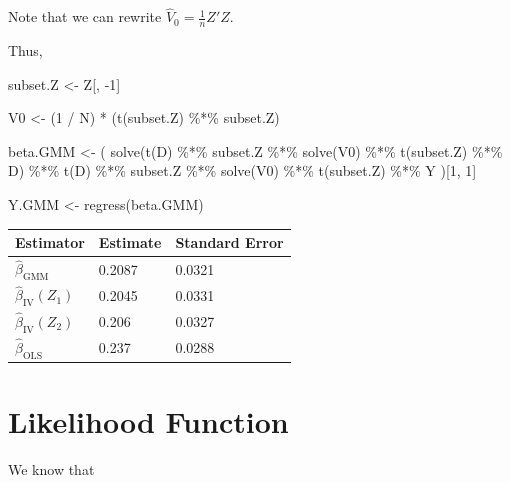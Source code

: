 \documentclass[9pt,twocolumn,twoside,]{pnas-new}
\newenvironment{Shaded}{}{}
\newcommand{\DecValTok}[1]{\textcolor[rgb]{0.25,0.63,0.44}{#1}}
\newcommand{\FunctionTok}[1]{\textcolor[rgb]{0.02,0.16,0.49}{#1}}
\newcommand{\NormalTok}[1]{#1}
\newcommand{\OtherTok}[1]{\textcolor[rgb]{0.00,0.44,0.13}{#1}}
\newcommand{\SpecialCharTok}[1]{\textcolor[rgb]{0.25,0.44,0.63}{#1}}
\begin{document}
Note that we can rewrite \(\displaystyle \hat{V}_0 = \frac{1}{n} Z' Z\).

Thus,

\begin{Shaded}
\begin{Highlighting}[]
\NormalTok{subset.Z }\OtherTok{\textless{}{-}}\NormalTok{ Z[, }\SpecialCharTok{{-}}\DecValTok{1}\NormalTok{]}

\NormalTok{V0 }\OtherTok{\textless{}{-}}\NormalTok{ (}\DecValTok{1} \SpecialCharTok{/}\NormalTok{ N) }\SpecialCharTok{*}\NormalTok{ (}\FunctionTok{t}\NormalTok{(subset.Z) }\SpecialCharTok{\%*\%}\NormalTok{ subset.Z)}

\NormalTok{beta.GMM }\OtherTok{\textless{}{-}}
\NormalTok{    (}
        \FunctionTok{solve}\NormalTok{(}\FunctionTok{t}\NormalTok{(D) }\SpecialCharTok{\%*\%}\NormalTok{ subset.Z }\SpecialCharTok{\%*\%} \FunctionTok{solve}\NormalTok{(V0) }\SpecialCharTok{\%*\%} \FunctionTok{t}\NormalTok{(subset.Z) }\SpecialCharTok{\%*\%}\NormalTok{ D) }\SpecialCharTok{\%*\%}
            \FunctionTok{t}\NormalTok{(D) }\SpecialCharTok{\%*\%}\NormalTok{ subset.Z }\SpecialCharTok{\%*\%} \FunctionTok{solve}\NormalTok{(V0) }\SpecialCharTok{\%*\%} \FunctionTok{t}\NormalTok{(subset.Z) }\SpecialCharTok{\%*\%}\NormalTok{ Y}
\NormalTok{    )[}\DecValTok{1}\NormalTok{, }\DecValTok{1}\NormalTok{]}

\NormalTok{Y.GMM }\OtherTok{\textless{}{-}} \FunctionTok{regress}\NormalTok{(beta.GMM)}
\end{Highlighting}
\end{Shaded}

\begin{longtable}[]{@{}lll@{}}
\toprule
Estimator & Estimate & Standard Error \\
\midrule
\endhead
\(\hat{\beta}_{\text{GMM}}\) & 0.2087 & 0.0321 \\
\(\hat{\beta}_{\text{IV}} (Z_1)\) & 0.2045 & 0.0331 \\
\(\hat{\beta}_{\text{IV}} (Z_2)\) & 0.206 & 0.0327 \\
\(\hat{\beta}_{\text{OLS}}\) & 0.237 & 0.0288 \\
\bottomrule
\end{longtable}

\hypertarget{likelihood-function}{%
\section{Likelihood Function}\label{likelihood-function}}

We know that
\end{document}
